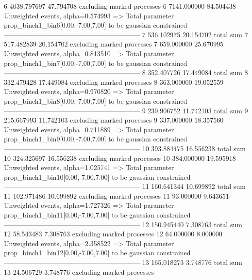 6          4038.797697     47.794708       excluding marked processes    
6          7141.000000     84.504438       Unweighted events, alpha=0.574993
  => Total parameter prop_binch1_bin6[0.00,-7.00,7.00] to be gaussian constrained
------------------------------------------------------------
7          536.102975      20.154702       total sum                     
7          517.482839      20.154702       excluding marked processes    
7          659.000000      25.670995       Unweighted events, alpha=0.813510
  => Total parameter prop_binch1_bin7[0.00,-7.00,7.00] to be gaussian constrained
------------------------------------------------------------
8          352.407726      17.449084       total sum                     
8          332.479428      17.449084       excluding marked processes    
8          363.000000      19.052559       Unweighted events, alpha=0.970820
  => Total parameter prop_binch1_bin8[0.00,-7.00,7.00] to be gaussian constrained
------------------------------------------------------------
9          239.906752      11.742103       total sum                     
9          215.667993      11.742103       excluding marked processes    
9          337.000000      18.357560       Unweighted events, alpha=0.711889
  => Total parameter prop_binch1_bin9[0.00,-7.00,7.00] to be gaussian constrained
------------------------------------------------------------
10         393.884475      16.556238       total sum                     
10         324.325697      16.556238       excluding marked processes    
10         384.000000      19.595918       Unweighted events, alpha=1.025741
  => Total parameter prop_binch1_bin10[0.00,-7.00,7.00] to be gaussian constrained
------------------------------------------------------------
11         160.641344      10.699892       total sum                     
11         102.971486      10.699892       excluding marked processes    
11         93.000000       9.643651        Unweighted events, alpha=1.727326
  => Total parameter prop_binch1_bin11[0.00,-7.00,7.00] to be gaussian constrained
------------------------------------------------------------
12         150.945440      7.308763        total sum                     
12         58.543483       7.308763        excluding marked processes    
12         64.000000       8.000000        Unweighted events, alpha=2.358522
  => Total parameter prop_binch1_bin12[0.00,-7.00,7.00] to be gaussian constrained
------------------------------------------------------------
13         165.018273      3.748776        total sum                     
13         24.506729       3.748776        excluding marked processes    
